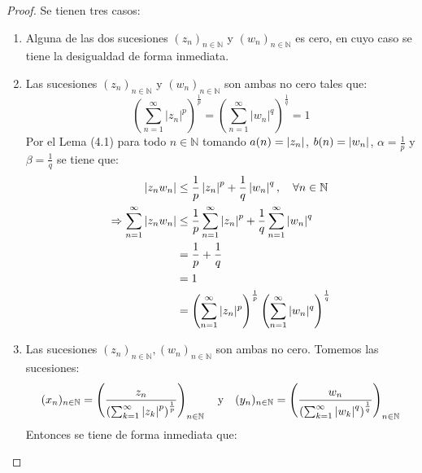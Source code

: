 \documentclass[twoside,12pt,a4 paper,openright]{book}
\begin{document}
\begin{enumerate}
    \begin{proof}
        Se tienen tres casos:
        \begin{enumerate}
            \item Alguna de las dos sucesiones $(z_n)_{n\in \mathbb N}$ y $(w_n)_{n\in \mathbb N}$ es cero, en cuyo caso se tiene la desigualdad de forma inmediata.
            \item Las sucesiones $(z_n)_{n\in \mathbb N}$ y $(w_n)_{n\in \mathbb N}$ son ambas no cero tales que:
            \begin{equation*}
                \left( \sum_{n=1}^{ \infty} |z_n|^{p}\right) ^{\frac{1}{p}}=\left(\sum_{n=1}^{\infty} |w_n|^{q}\right)^{\frac{1}{q}}=1
            \end{equation*}
            Por el Lema (4.1) para todo $n\in\mathbb{N}$ tomando $a(n)=\left|z_n\right|$, $b(n)=\left|w_n\right|$, $\alpha=\frac{1}{p}$ y $\beta=\frac{1}{q}$ se tiene que:
            \begin{equation*}
                \begin{split}
                    \left|z_nw_n\right|&\leq\frac{1}{p}\left|z_n\right|^{p}+\frac{1}{q}\left|w_n\right|^{q},\quad\forall n\in\mathbb{N}\\
                    \Rightarrow\sum_{ n=1}^\infty\left|z_nw_n\right|&\leq\frac{1}{p}\sum_{ n=1}^\infty\left|z_n\right|^p+\frac{1}{q}\sum_{ n=1}^\infty\left|w_n\right|^q\\
                    &=\frac{1}{p}+\frac{1}{q}\\
                    &=1\\
                    &=\left( \sum_{n=1}^{ \infty} |z_n|^{p}\right) ^{\frac{1}{p}}\left(\sum_{n=1}^{\infty} |w_n|^{q}\right)^{\frac{1}{q}}\\
                \end{split}
            \end{equation*}
            \item Las sucesiones $(z_n)_{n\in\mathbb{N}},(w_n)_{n\in\mathbb{N}}$ son ambas no cero. Tomemos las sucesiones:
            \begin{equation*}
                (x_n)_{n\in\mathbb{N}}=\left(\frac{z_n}{\left(\sum_{ k=1}^\infty\left|z_k\right|^p\right)^{\frac{1}{p}}} \right)_{ n\in\mathbb{N}}\quad\textup{y}\quad(y_n)_{n\in\mathbb{N}}=\left(\frac{w_n}{\left(\sum_{ k=1}^\infty\left|w_k\right|^q\right)^{\frac{1}{q}}} \right)_{ n\in\mathbb{N}}
            \end{equation*}
            Entonces se tiene de forma inmediata que:
            \begin{equation*}

\end{equation*}
\end{enumerate}
\end{proof}
\end{enumerate}
\end{document}
